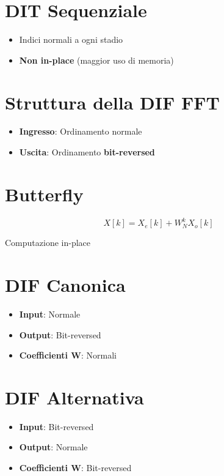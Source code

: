 \section*{DIT Sequenziale}

\begin{itemize}
    \item Indici normali a ogni stadio
    \item \textbf{Non in-place} (maggior uso di memoria)
\end{itemize}

\section*{Struttura della DIF FFT}

\begin{itemize}
    \item \textbf{Ingresso}: Ordinamento normale
    \item \textbf{Uscita}: Ordinamento \textbf{bit-reversed}
\end{itemize}

\section*{Butterfly}
\[
X[k] = X_e[k] + W_N^k X_o[k]
\]

Computazione in-place

\section*{DIF Canonica}

\begin{itemize}
    \item \textbf{Input}: Normale
    \item \textbf{Output}: Bit-reversed
    \item \textbf{Coefficienti W}: Normali
\end{itemize}

\section*{DIF Alternativa}

\begin{itemize}
    \item \textbf{Input}: Bit-reversed
    \item \textbf{Output}: Normale
    \item \textbf{Coefficienti W}: Bit-reversed
\end{itemize}

